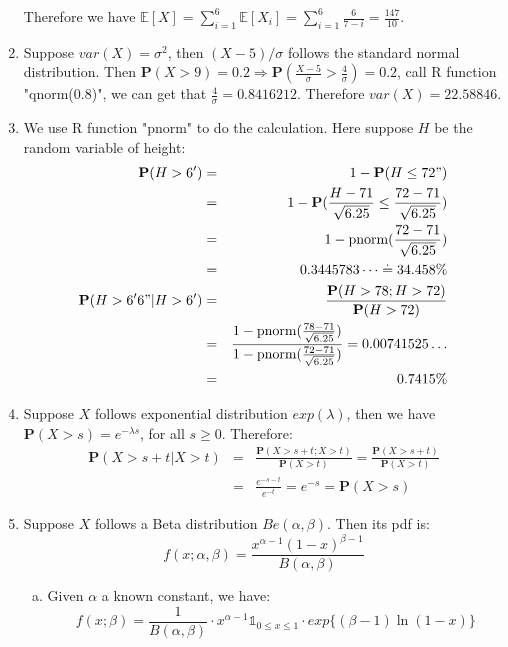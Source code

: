 \documentclass[12pt]{article}
\newcommand{\prob}[1]{\textbf{P}(#1)}
\begin{document}
\begin{enumerate}
    Therefore we have $\mathbb{E}[X] = \sum_{i=1}^{6} \mathbb{E}[X_i] = \sum_{i=1}^{6} \frac{6}{7-i} = \frac{147}{10}$.
    \item
    Suppose $var(X) = \sigma^2$, then $(X - 5) / \sigma$ follows the standard normal distribution. Then $\prob{X > 9} = 0.2 \Rightarrow \prob{\frac{X-5}{\sigma} > \frac{4}{\sigma}} = 0.2$, 
    call R function "qnorm(0.8)", we can get that $\frac{4}{\sigma} = 0.8416212$. Therefore $var(X) = 22.58846$.
    \item
    We use R function "pnorm" to do the calculation. Here suppose $H$ be the random variable of height:
    \begin{eqnarray}
        \prob{H > 6'} &=& 1 - \prob{H \le 72"} \\
                            &=& 1 - \prob{\frac{H-71}{\sqrt{6.25}} \le \frac{72-71}{\sqrt{6.25}}} \\
                           &=& 1 - \text{pnorm}(\frac{72-71}{\sqrt{6.25}})\\
                            &=& 0.3445783\dots \doteq 34.458\% \\
        \prob{H > 6'6" | H > 6'} &=& \frac{\prob{H > 78 ; H > 72}}{\prob{H > 72}} \\
                           &=& \frac{1 - \text{pnorm}(\frac{78-71}{\sqrt{6.25}})}{1 - \text{pnorm}(\frac{72-71}{\sqrt{6.25}})} = 0.00741525\dots \\
                          &=& 0.7415\% 
    \end{eqnarray}
    \item
    Suppose $X$ follows exponential distribution $exp(\lambda)$, then we have $\prob{X > s} = e^{- \lambda s}$, for all $s \ge 0$.
    Therefore:
    \begin{eqnarray}
        \prob{X > s + t | X > t} &=& \frac{\prob{X>s+t;X>t}}{\prob{X>t}} = \frac{\prob{X>s+t}}{\prob{X>t}} \\ 
                                 &=& \frac{e^{-s-t}}{e^{-t}} = e^{-s} = \prob{X > s} 
    \end{eqnarray}
    \item
    Suppose $X$ follows a Beta distribution $Be(\alpha,\beta)$. Then its pdf is: 
    $$f(x;\alpha,\beta) = \frac{x^{\alpha-1}(1-x)^{\beta-1}}{B(\alpha,\beta)}$$
    \begin{enumerate}[(a)]
        \item
        Given $\alpha$ a known constant, we have:
        $$f(x;\beta) = \frac{1}{B(\alpha,\beta)} \cdot x^{\alpha -1} \mathds{1}_{0\le x \le1} \cdot exp\{(\beta-1)\ln(1-x)\}$$

\end{enumerate}
\end{enumerate}
\end{document}
